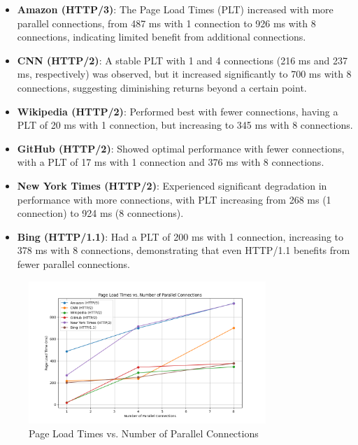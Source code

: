 \documentclass[a4paper,10pt]{article}
\begin{document}
\begin{itemize}
    \item \textbf{Amazon (HTTP/3)}: The Page Load Times (PLT) increased with more parallel connections, from 487 ms with 1 connection to 926 ms with 8 connections, indicating limited benefit from additional connections.
    \item \textbf{CNN (HTTP/2)}: A stable PLT with 1 and 4 connections (216 ms and 237 ms, respectively) was observed, but it increased significantly to 700 ms with 8 connections, suggesting diminishing returns beyond a certain point.
    \item \textbf{Wikipedia (HTTP/2)}: Performed best with fewer connections, having a PLT of 20 ms with 1 connection, but increasing to 345 ms with 8 connections.
    \item \textbf{GitHub (HTTP/2)}: Showed optimal performance with fewer connections, with a PLT of 17 ms with 1 connection and 376 ms with 8 connections.
    \item \textbf{New York Times (HTTP/2)}: Experienced significant degradation in performance with more connections, with PLT increasing from 268 ms (1 connection) to 924 ms (8 connections).
    \item \textbf{Bing (HTTP/1.1)}: Had a PLT of 200 ms with 1 connection, increasing to 378 ms with 8 connections, demonstrating that even HTTP/1.1 benefits from fewer parallel connections.
\end{itemize}

\begin{figure}[ht]
\centering
\includegraphics[width=0.8\textwidth]{plt_vs_connections.png}
\caption{Page Load Times vs. Number of Parallel Connections}
\label{fig:plt-vs-connections}
\end{figure}
\end{document}
